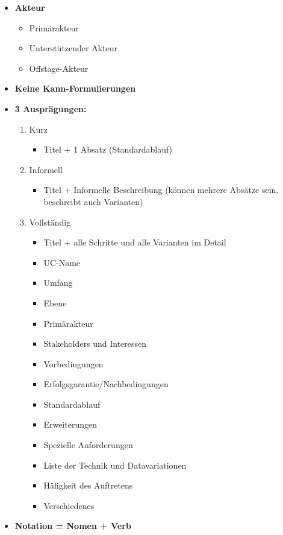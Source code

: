 \documentclass[../ZF_SWEN1.tex]{subfiles}
\begin{document}
\begin{itemize}
	\item \colorbox {green!30}{\textbf{Akteur}}
	\begin{itemize}
		\item Primärakteur
		\item Unterstützender Akteur
		\item Offstage-Akteur
	\end{itemize}
	\item \colorbox {green!30}{\textbf{Keine Kann-Formulierungen}}
	\item \colorbox {green!30}{\textbf{3 Ausprägungen:}}
	\begin{enumerate}
		\item Kurz
		\begin{itemize}
			\item Titel + 1 Absatz (Standardablauf)
		\end{itemize}
		\item Informell
		\begin{itemize}
			\item Titel + Informelle Beschreibung (können mehrere Absätze sein, beschreibt auch Varianten)
		\end{itemize}
		\item Vollständig
		\begin{itemize}
			\item Titel + alle Schritte und alle Varianten im Detail
			\item UC-Name
			\item Umfang
			\item Ebene
			\item Primärakteur
			\item Stakeholders und Interessen
			\item Vorbedingungen
			\item Erfolgsgarantie/Nachbedingungen
			\item Standardablauf
			\item Erweiterungen
			\item Spezielle Anforderungen
			\item Liste der Technik und Datavariationen
			\item Häfigkeit des Auftretens
			\item Verschiedenes
		\end{itemize}
		
	\end{enumerate}
	\item \colorbox {green!30}{\textbf{Notation = Nomen + Verb}}
\end{itemize}
\end{document}

